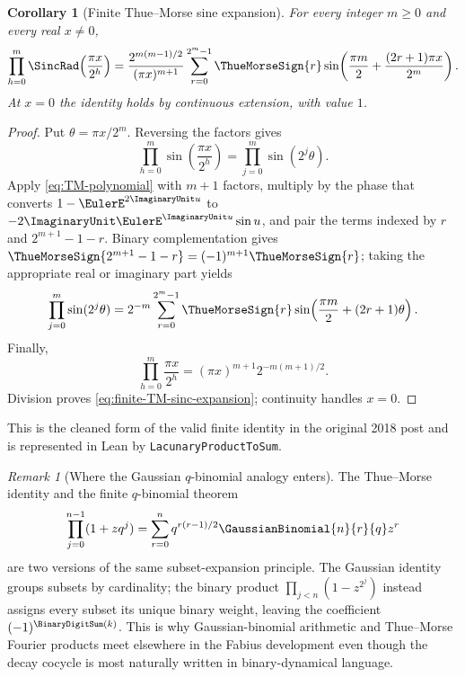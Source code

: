 \documentclass[11pt,oneside]{article}
\numberwithin{equation}{section}
\newtheorem{corollary}[theorem]{Corollary}
\theoremstyle{definition}
\theoremstyle{remark}
\newtheorem{remark}[theorem]{Remark}
\newcommand{\lean}[1]{\texttt{#1}}
\begin{document}
\begin{corollary}[Finite Thue--Morse sine expansion]
\label{cor:finite-TM-sinc-expansion}
For every integer $m\ge0$ and every real $x\ne0$,
\begin{align}
 \prod_{h=0}^{m}\SincRad\!\left(\frac{\pi x}{2^h}\right)
 =\frac{2^{m(m-1)/2}}{(\pi x)^{m+1}}
 \sum_{r=0}^{2^m-1}\ThueMorseSign{r}
 \sin\!\left(\frac{\pi m}{2}+\frac{(2r+1)\pi x}{2^m}\right).
 \label{eq:finite-TM-sinc-expansion}
\end{align}
At $x=0$ the identity holds by continuous extension, with value $1$.
\end{corollary}

\begin{proof}
Put $\theta=\pi x/2^m$.  Reversing the factors gives
\[
 \prod_{h=0}^{m}\sin\!\left(\frac{\pi x}{2^h}\right)
 =\prod_{j=0}^{m}\sin(2^j\theta).
\]
Apply \eqref{eq:TM-polynomial} with $m+1$ factors, multiply by the phase that converts
$1-\EulerE^{2\ImaginaryUnit u}$ to $-2\ImaginaryUnit\EulerE^{\ImaginaryUnit u}\sin u$, and pair the terms indexed by
$r$ and $2^{m+1}-1-r$.  Binary complementation gives
$\ThueMorseSign{2^{m+1}-1-r}=(-1)^{m+1}\ThueMorseSign{r}$; taking the appropriate real or imaginary part yields
\[
 \prod_{j=0}^{m}\sin(2^j\theta)
 =2^{-m}\sum_{r=0}^{2^m-1}\ThueMorseSign{r}
   \sin\!\left(\frac{\pi m}{2}+(2r+1)\theta\right).
\]
Finally,
\[
 \prod_{h=0}^{m}\frac{\pi x}{2^h}
 =(\pi x)^{m+1}2^{-m(m+1)/2}.
\]
Division proves \eqref{eq:finite-TM-sinc-expansion}; continuity handles $x=0$.
\end{proof}

This is the cleaned form of the valid finite identity in the original 2018 post and is
represented in Lean by \lean{LacunaryProductToSum}.

\begin{remark}[Where the Gaussian $q$-binomial analogy enters]
The Thue--Morse identity and the finite $q$-binomial theorem
\[
 \prod_{j=0}^{n-1}(1+zq^j)
 =\sum_{r=0}^{n}q^{r(r-1)/2}\GaussianBinomial{n}{r}{q}z^r
\]
are two versions of the same subset-expansion principle.  The Gaussian identity groups
subsets by cardinality; the binary product
$\prod_{j<n}(1-z^{2^j})$ instead assigns every subset its unique binary weight, leaving the
coefficient $(-1)^{\BinaryDigitSum(k)}$.  This is why Gaussian-binomial arithmetic and Thue--Morse
Fourier products meet elsewhere in the Fabius development even though the decay cocycle is
most naturally written in binary-dynamical language.
\end{remark}
\end{document}
